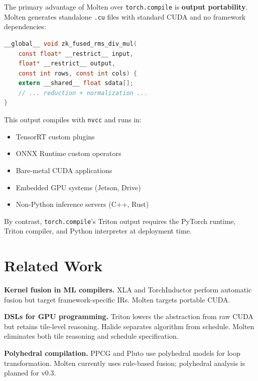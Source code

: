 \documentclass[11pt,a4paper]{article}
\begin{document}
The primary advantage of Molten over \texttt{torch.compile} is
\textbf{output portability}. Molten generates standalone \texttt{.cu} files
with standard CUDA and no framework dependencies:

\begin{lstlisting}[language=C,caption={Molten-generated fused RMSNorm (abbreviated).}]
__global__ void zk_fused_rms_div_mul(
    const float* __restrict__ input,
    float* __restrict__ output,
    const int rows, const int cols) {
    extern __shared__ float sdata[];
    // ... reduction + normalization ...
}
\end{lstlisting}

This output compiles with \texttt{nvcc} and runs in:
\begin{itemize}
  \item TensorRT custom plugins
  \item ONNX Runtime custom operators
  \item Bare-metal CUDA applications
  \item Embedded GPU systems (Jetson, Drive)
  \item Non-Python inference servers (C++, Rust)
\end{itemize}

By contrast, \texttt{torch.compile}'s Triton output requires the PyTorch
runtime, Triton compiler, and Python interpreter at deployment time.

\section{Related Work}

\textbf{Kernel fusion in ML compilers.} XLA \cite{xla2017} and TorchInductor
\cite{ansel2024pytorch2} perform automatic fusion but target framework-specific
IRs. Molten targets portable CUDA.

\textbf{DSLs for GPU programming.} Triton \cite{tillet2019triton} lowers the
abstraction from raw CUDA but retains tile-level reasoning. Halide
\cite{ragan-kelley2013halide} separates algorithm from schedule. Molten
eliminates both tile reasoning and schedule specification.

\textbf{Polyhedral compilation.} PPCG \cite{verdoolaege2013ppcg} and Pluto
\cite{bondhugula2008pluto} use polyhedral models for loop transformation.
Molten currently uses rule-based fusion; polyhedral analysis is planned for v0.3.
\end{document}
